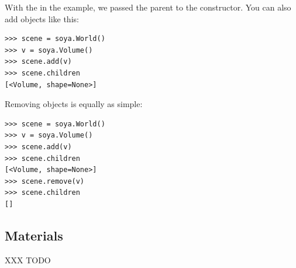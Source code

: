 With the  in the example, we passed the parent to 
the constructor. You can also add objects like this:
\begin{verbatim}
>>> scene = soya.World()
>>> v = soya.Volume()
>>> scene.add(v)
>>> scene.children
[<Volume, shape=None>]
\end{verbatim}

Removing objects is equally as simple:
\begin{verbatim}
>>> scene = soya.World()
>>> v = soya.Volume()
>>> scene.add(v)
>>> scene.children
[<Volume, shape=None>]
>>> scene.remove(v)
>>> scene.children
[]
\end{verbatim}

\subsection{Materials}
XXX TODO

